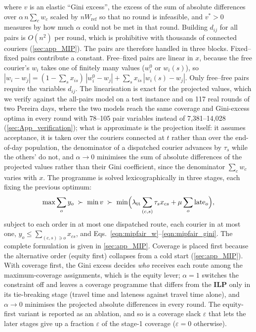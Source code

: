 \documentclass[a4paper,11pt,review,3p,authoryear]{elsarticle}
\begin{document}
where $v$ is an elastic \enquote{Gini excess}, the excess of the sum of absolute differences over $\alpha\, n \sum_c w_c$ scaled by $n W_{\text{ref}}$ so that no round is infeasible, and $v^* > 0$ measures by how much $\alpha$ could not be met in that round. Building $d_{ij}$ for all pairs is $O(n^2)$ per round, which is prohibitive with thousands of connected couriers (\ref{sec:app_MIP}). The pairs are therefore handled in three blocks. Fixed--fixed pairs contribute a constant. Free--fixed pairs are linear in $x$, because the free courier's $w_i$ takes one of finitely many values ($w_i^0$ or $w_i(s)$), so $|w_i - w_j| = (1 - \sum_s x_{is})\,|w_i^0 - w_j| + \sum_s x_{is}\,|w_i(s) - w_j|$. Only free--free pairs require the variables $d_{ij}$. The linearisation is exact for the projected values, which we verify against the all-pairs model on a test instance and on 117 real rounds of two Pereira days, where the two models reach the same coverage and Gini-excess optima in every round with 78--105 pair variables instead of 7{,}381--14{,}028 (\ref{sec:App_verification}); what is approximate is the projection itself: it assumes acceptance, it is taken over the couriers connected at $t$ rather than over the end-of-day population, the denominator of a dispatched courier advances by $\tau_s$ while the others' do not, and $\alpha \to 0$ minimises the sum of absolute differences of the projected values rather than their Gini coefficient, since the denominator $\sum_c w_c$ varies with $x$. The programme is solved lexicographically in three stages, each fixing the previous optimum:
\begin{equation}
\max \sum_o y_o \;\succ\; \min v \;\succ\; \min \Bigl(\lambda_{\text{tt}} \sum_{(c,s)} \tau_s x_{cs} + \mu \sum_o \text{late}_o\Bigr),
\label{eqn:mipfair_lex}
\end{equation}
subject to each order in at most one dispatched route, each courier in at most one, $y_o \le \sum_{(c,s) \ni o} x_{cs}$, and Eqs.~\eqref{eqn:mipfair_w}--\eqref{eqn:mipfair_gini}. The complete formulation is given in \ref{sec:app_MIP}. Coverage is placed first because the alternative order (equity first) collapses from a cold start (\ref{sec:app_MIP}). With coverage first, the Gini excess decides \emph{who} receives each route among the maximum-coverage assignments, which is the equity lever; $\alpha = 1$ switches the constraint off and leaves a coverage programme that differs from the \textbf{ILP} only in its tie-breaking stage (travel time and lateness against travel time alone), and $\alpha \to 0$ minimises the projected absolute differences in every round. The equity-first variant is reported as an ablation, and so is a coverage slack $\varepsilon$ that lets the later stages give up a fraction $\varepsilon$ of the stage-1 coverage ($\varepsilon = 0$ otherwise).
\end{document}
